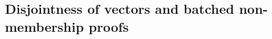 \documentclass[11pt, lettersize, notitlepage, leqno, footskip=0.6cm]{article}
\newcommand{\mc}{\mathcal}
\newcommand{\sub}{\subseteq}
\newcommand{\vs}{\vspace{-0.15cm}}
\newcommand{\noin}{\noindent}
\numberwithin{equation}{section}
\begin{document}
\begin{comment}

Let $A = g_1^{f(s)}$ be the commitment to a polynomial $f(X)$. This can be interpreted as a commitment to the vector $(v_0,\cdots,v_n)$ where $f(X) = \sum_{i=0}^n v_i X^i$.

Consider a setting where a Prover wants to show that the key-value pairs $(k_1,v_1),\cdots,(k_j, v_j)$ are a part of the committed vector. In other words, the Prover needs to show that the polynomial \vs $$f_0(X):= \sum_{i=1}^j c_j X^{k_j} $$ is ``a part of" the committed polynomial $f(X)$ in the sense that there is a subset $\mc{I}\sub [0,\;\deg(f)]$ such that the Hadamard product of $f(X)$
 and $\chi_{_{\mc{I}}}(X)$ is $f_0(X)$.


To this end, the Prover sends the commitment $$ A_0:= g_1^{f_0(s)}$$ to $f_0(X)$. He computes the set $\mc{I}:= \{k_1,\cdots,k_j \}$ and sends the commitment $${\tt{Com}}(\mc{I}):= g_1^{\chi_{_{\mc{I}}}(s)}. $$ The Prover uses the protocol $(\hyperlink{Binary}{\tt{ZKPoBinary}})$ to show that ${\tt{Com}}(\mc{I})$ is a commitment to some binary polynomial. He then uses the protocol $(\hyperlink{HadProd}{\tt{ZKPoHadProd}})$ to show that the polynomials committed in $A$ and ${\tt{Com}}(\mc{I})$ have Hadamard product that coincides with the polynomial committed in $A_0$.


This proof is constant-sized and is publicly verifiable against the commitments to $f(X)$ and $f_0(X)$. The Verifier does not need to store the entire committed polynomial $f(X)$ or the key-value pairs $(k_1,v_1),\cdots,(k_j, v_j)$ in order to verify the proof.



 Later, we will discuss a protocol ($\hyperlink{NumZeroCoef}{\tt{ZKNumNZCoef}}$) that links the commitment to the polynomial $f_0(X)$ to the a commitment to the size of the set of key-value pairs represented by $f_0(X)$. This boils down to linking the following:\vspace{2mm}

\noin - a commitment to a polynomial \vspace{1mm}

\noin - a commitment to the number of non-zero coefficients of this polynomial. \end{comment}

\subsection{\fontsize{11}{11}\selectfont Disjointness of vectors and batched non-membership proofs}
\end{document}
